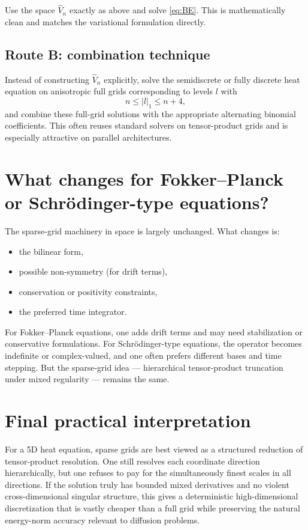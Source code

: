 \documentclass[11pt,a4paper]{report}
\begin{document}
Use the space $\widehat V_n$ exactly as above and solve \eqref{eq:BE}. This is mathematically clean and matches the variational formulation directly.

\subsection{Route B: combination technique}

Instead of constructing $\widehat V_n$ explicitly, solve the semidiscrete or fully discrete heat equation on anisotropic full grids corresponding to levels $l$ with
$$
n\le |l|_1 \le n+4,
$$
and combine these full-grid solutions with the appropriate alternating binomial coefficients. This often reuses standard solvers on tensor-product grids and is especially attractive on parallel architectures.

\section{What changes for Fokker--Planck or Schr\"odinger-type equations?}

The sparse-grid machinery in space is largely unchanged. What changes is:
\begin{itemize}
\item the bilinear form,
\item possible non-symmetry (for drift terms),
\item conservation or positivity constraints,
\item the preferred time integrator.
\end{itemize}
For Fokker--Planck equations, one adds drift terms and may need stabilization or conservative formulations. For Schr\"odinger-type equations, the operator becomes indefinite or complex-valued, and one often prefers different bases and time stepping. But the sparse-grid idea --- hierarchical tensor-product truncation under mixed regularity --- remains the same.

\section{Final practical interpretation}

For a 5D heat equation, sparse grids are best viewed as a structured reduction of tensor-product resolution. One still resolves each coordinate direction hierarchically, but one refuses to pay for the simultaneously finest scales in all directions. If the solution truly has bounded mixed derivatives and no violent cross-dimensional singular structure, this gives a deterministic high-dimensional discretization that is vastly cheaper than a full grid while preserving the natural energy-norm accuracy relevant to diffusion problems.
\end{document}
